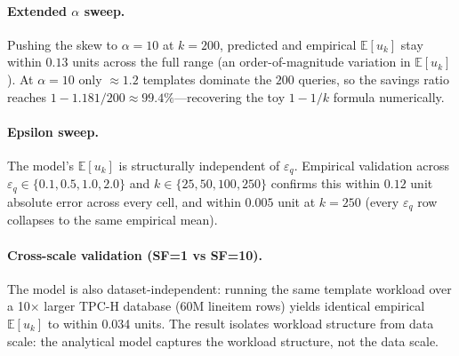\documentclass[sigconf,nonacm]{acmart}
\newcommand{\eps}{\varepsilon}
\newcommand{\E}{\mathbb{E}}
\begin{document}
\paragraph{Extended $\alpha$ sweep.} Pushing the skew to $\alpha=10$ at $k=200$, predicted and empirical $\E[u_k]$ stay within $0.13$ units across the full range (an order-of-magnitude variation in $\E[u_k]$). At $\alpha=10$ only $\approx 1.2$ templates dominate the $200$ queries, so the savings ratio reaches $1-1.181/200\approx 99.4\%$---recovering the toy $1-1/k$ formula numerically.

\paragraph{Epsilon sweep.} The model's $\E[u_k]$ is structurally independent of $\eps_q$. Empirical validation across $\eps_q \in \{0.1, 0.5, 1.0, 2.0\}$ and $k\in\{25,50,100,250\}$ confirms this within $0.12$ unit absolute error across every cell, and within $0.005$ unit at $k=250$ (every $\eps_q$ row collapses to the same empirical mean).

\paragraph{Cross-scale validation (SF=1 vs SF=10).} The model is also dataset-independent: running the same template workload over a 10$\times$ larger TPC-H database (60M lineitem rows) yields identical empirical $\E[u_k]$ to within 0.034 units. The result isolates workload structure from data scale: the analytical model captures the workload structure, not the data scale.
\end{document}
